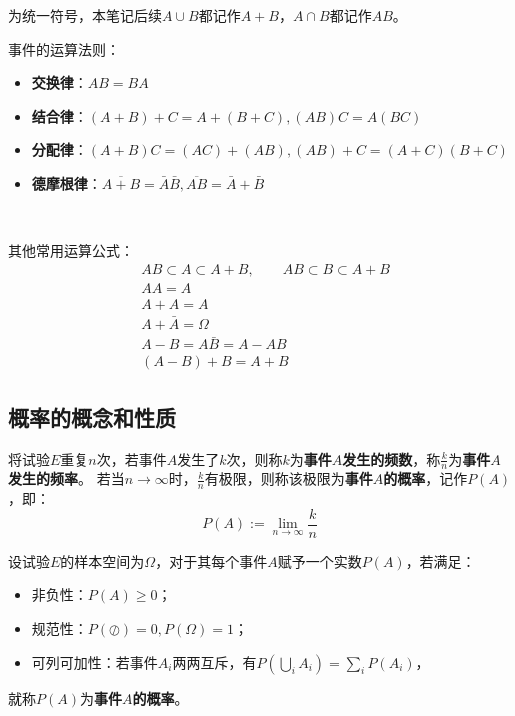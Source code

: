\begin{tcolorbox}
为统一符号，本笔记后续$A\cup B$都记作$A+B$，$A\cap B$都记作$AB$。
\end{tcolorbox}

事件的运算法则：
\begin{itemize}
    \item {\bf 交换律}：$AB=BA$
    \item {\bf 结合律}：$\left( A+B \right) +C=A+\left( B+C \right) ,\left( AB \right) C=A\left( BC \right) $
    \item {\bf 分配律}：$\left( A+B \right) C=\left( AC \right) +\left( AB \right) ,\left( AB \right) +C=\left( A+C \right) \left( B+C \right) $
    \item {\bf 德摩根律}：$\overline{A+B}=\bar{A}\bar{B},\overline{AB}=\bar{A}+\bar{B}$
\end{itemize}

~

其他常用运算公式：
\begin{align*}
& AB\subset A\subset A+B,\qquad AB\subset B\subset A+B \\
& AA=A \\
& A+A=A \\
& A+\bar{A}=\varOmega \\
& A-B=A\bar{B}=A-AB \\
& \left( A-B \right) +B=A+B
\end{align*}


\subsection{概率的概念和性质}

\begin{definition}[统计定义]
将试验$E$重复$n$次，若事件$A$发生了$k$次，则称$k$为{\bf 事件$A$发生的频数}，称$\frac{k}{n}$为{\bf 事件$A$发生的频率}。
若当$n\rightarrow \infty$时，$\frac{k}{n}$有极限，则称该极限为{\bf 事件$A$的概率}，记作$P\left( A \right) $，即：
\[
P\left( A \right) := \underset{n\rightarrow \infty}{\lim}\frac{k}{n}
\]
\end{definition}

\begin{definition}[公理化定义]
设试验$E$的样本空间为$\varOmega$，对于其每个事件$A$赋予一个实数$P\left( A \right) $，若满足：
\begin{itemize}
    \item 非负性：$P\left( A \right) \geqslant 0$；
    \item 规范性：$P\left( \oslash \right) =0,P\left( \varOmega \right) =1$；
    \item 可列可加性：若事件$A_i$两两互斥，有$P\left( \bigcup_i{A_i} \right) =\sum_i{P\left( A_i \right)}$，
\end{itemize}
就称$P\left( A \right)$为{\bf 事件$A$的概率}。
\end{definition}

